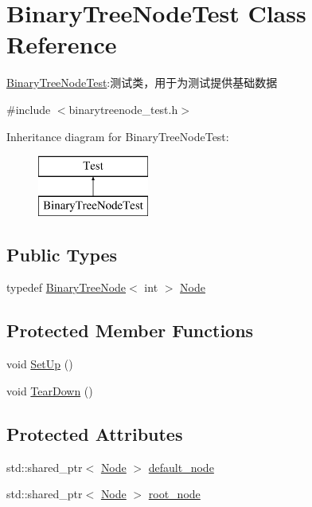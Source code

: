 \hypertarget{class_binary_tree_node_test}{}\section{Binary\+Tree\+Node\+Test Class Reference}
\label{class_binary_tree_node_test}


\hyperlink{class_binary_tree_node_test}{Binary\+Tree\+Node\+Test}\+:测试类，用于为测试提供基础数据  




{\ttfamily \#include $<$binarytreenode\+\_\+test.\+h$>$}

Inheritance diagram for Binary\+Tree\+Node\+Test\+:\begin{figure}[H]
\begin{center}
\leavevmode
\includegraphics[height=2.000000cm]{class_binary_tree_node_test}
\end{center}
\end{figure}
\subsection*{Public Types}
\begin{DoxyCompactItemize}
\item 
typedef \hyperlink{struct_introduction_to_algorithm_1_1_tree_algorithm_1_1_binary_tree_node}{Binary\+Tree\+Node}$<$ int $>$ \hyperlink{class_binary_tree_node_test_aa8508b87ef3554a5dd1069a460f38679}{Node}
\end{DoxyCompactItemize}
\subsection*{Protected Member Functions}
\begin{DoxyCompactItemize}
\item 
void \hyperlink{class_binary_tree_node_test_a60ff0f181a5e3a45742949b1948b8095}{Set\+Up} ()
\item 
void \hyperlink{class_binary_tree_node_test_a93cbc74d7d46635510578aefa62ceca5}{Tear\+Down} ()
\end{DoxyCompactItemize}
\subsection*{Protected Attributes}
\begin{DoxyCompactItemize}
\item 
std\+::shared\+\_\+ptr$<$ \hyperlink{class_binary_tree_node_test_aa8508b87ef3554a5dd1069a460f38679}{Node} $>$ \hyperlink{class_binary_tree_node_test_af2db7bcee955bff2d4d2aa815a09b329}{default\+\_\+node}
\item 
std\+::shared\+\_\+ptr$<$ \hyperlink{class_binary_tree_node_test_aa8508b87ef3554a5dd1069a460f38679}{Node} $>$ \hyperlink{class_binary_tree_node_test_a07aad40489fc19ed29863c82a6c14863}{root\+\_\+node}
\end{DoxyCompactItemize}


